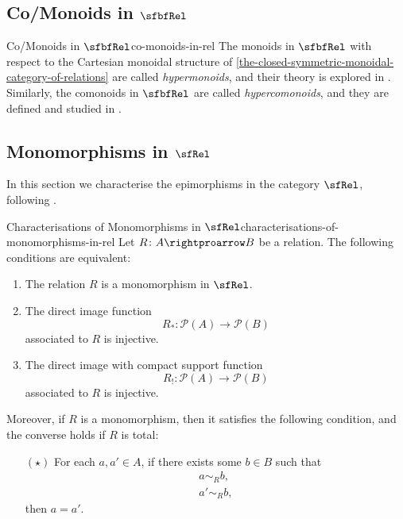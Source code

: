 \subsection{Co/Monoids in $\sfbfRel$}\label{subsection-co-monoids-in-rel}
\begin{remark}{Co/Monoids in $\sfbfRel$}{co-monoids-in-rel}%
    The monoids in $\sfbfRel$ with respect to the Cartesian monoidal structure of \cref{the-closed-symmetric-monoidal-category-of-relations} are called \emph{hypermonoids}, and their theory is explored in \ChapterHypermonoids. Similarly, the comonoids in $\sfbfRel$ are called \emph{hypercomonoids}, and they are defined and studied in \ChapterHypergroups.
\end{remark}
\subsection{Monomorphisms in $\sfRel$}\label{subsection-monomorphisms-in-rel}
In this section we characterise the epimorphisms in the category $\sfRel$, following .
\begin{proposition}{Characterisations of Monomorphisms in $\sfRel$}{characterisations-of-monomorphisms-in-rel}%
    Let $R\colon A\rightproarrow B$ be a relation. The following conditions are equivalent:
    \begin{enumerate}
        \item\label{characterisations-of-monomorphisms-in-rel-1}The relation $R$ is a monomorphism in $\sfRel$.
        \item\label{characterisations-of-monomorphisms-in-rel-2}The direct image function%
            \[
                R_{*}%
                \colon%
                \mathcal{P}(A)%
                \to%
                \mathcal{P}(B)%
            \]%
            associated to $R$ is injective.
        \item\label{characterisations-of-monomorphisms-in-rel-3}The direct image with compact support function
            \[
                R_{!}%
                \colon%
                \mathcal{P}(A)%
                \to%
                \mathcal{P}(B)%
            \]%
            associated to $R$ is injective.
    \end{enumerate}
    Moreover, if $R$ is a monomorphism, then it satisfies the following condition, and the converse holds if $R$ is total:
    \begin{itemize}%
        \item[$(\star)$]For each $a,a'\in A$, if there exists some $b\in B$ such that
            \begin{align*}%
                a\sim_{R}b,\\%
                a'\sim_{R}b,%
            \end{align*}%
            then $a=a'$.
    \end{itemize}%
\end{proposition}
